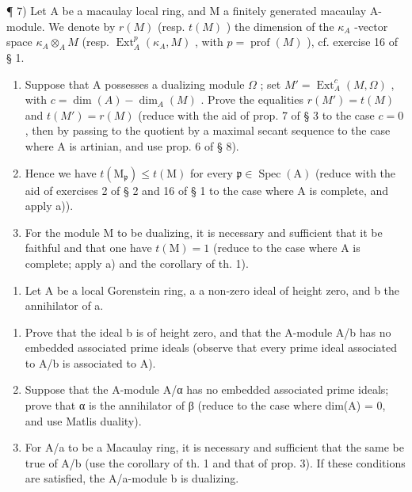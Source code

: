 ¶ 7) Let A be a macaulay local ring, and M a finitely generated macaulay A-module. We denote by \(r(M)\) (resp. \(t(M)\) ) the dimension of the \(\kappa_{A}\) -vector space \(\kappa_{A} \otimes_{A} M\) (resp. \(\operatorname{Ext}_{A}^{p}(\kappa_{A}, M)\) , with \(p = \operatorname{prof}(M)\) ), cf. exercise 16 of § 1.

\begin{enumerate}
\def\labelenumi{\alph{enumi})}
\item
  Suppose that A possesses a dualizing module \(\Omega\) ; set \(M' = \operatorname{Ext}_A^c(M, \Omega)\) , with \(c = \dim(A) - \dim_A(M)\) . Prove the equalities \(r(M') = t(M)\) and \(t(M') = r(M)\) (reduce with the aid of prop. 7 of § 3 to the case \(c = 0\) , then by passing to the quotient by a maximal secant sequence to the case where A is artinian, and use prop. 6 of § 8).
\item
  Hence we have \(t(\mathrm{M}_{\mathfrak{p}}) \leqslant t(\mathrm{M})\) for every \(\mathfrak{p} \in \operatorname{Spec}(\mathrm{A})\) (reduce with the aid of exercises 2 of § 2 and 16 of § 1 to the case where A is complete, and apply a)).
\item
  For the module M to be dualizing, it is necessary and sufficient that it be faithful and that one have \(t(\mathrm{M}) = 1\) (reduce to the case where A is complete; apply a) and the corollary of th. 1).
\end{enumerate}

\begin{enumerate}
\def\labelenumi{\arabic{enumi})}
\setcounter{enumi}{7}
\tightlist
\item
  Let A be a local Gorenstein ring, a a non-zero ideal of height zero, and b the annihilator of a.
\end{enumerate}

\begin{enumerate}
\def\labelenumi{\alph{enumi})}
\item
  Prove that the ideal b is of height zero, and that the A-module A/b has no embedded associated prime ideals (observe that every prime ideal associated to A/b is associated to A).
\item
  Suppose that the A-module A/α has no embedded associated prime ideals; prove that α is the annihilator of β (reduce to the case where dim(A) = 0, and use Matlis duality).
\item
  For A/a to be a Macaulay ring, it is necessary and sufficient that the same be true of A/b (use the corollary of th. 1 and that of prop. 3). If these conditions are satisfied, the A/a-module b is dualizing.
\end{enumerate}

